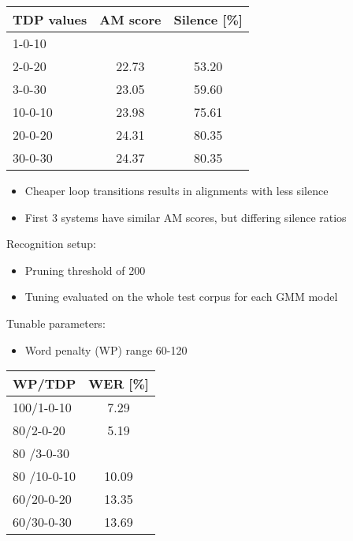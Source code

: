 \documentclass[11pt, a4paper, landscape]{article}
\begin{document}
\begin{center}
\begin{tabular}{| l |  c | c |} \toprule
  TDP values & AM score           & Silence [\%]      \\ \midrule
  1-0-10     & \color{red}{22.68} & \color{red}{43.48}\\
  2-0-20     & 22.73              & 53.20             \\
  3-0-30     & 23.05              & 59.60             \\ \midrule
  10-0-10    & 23.98              & 75.61             \\
  20-0-20    & 24.31              & 80.35             \\
  30-0-30    & 24.37              & 80.35             \\ \bottomrule
\end{tabular}
\end{center}
\begin{itemize}
	\item Cheaper loop transitions results in alignments with less silence
	\item First 3 systems have similar AM scores, but differing silence ratios
\end{itemize}
\vfill


\NewPage{}
\vfill
Recognition setup:
\begin{itemize}
	\item Pruning threshold of 200
	\item Tuning evaluated on the whole test corpus for each GMM model
\end{itemize}
Tunable parameters:
\begin{itemize}	
	\item Word penalty (WP) range 60-120
\end{itemize}

\begin{center}
	\begin{tabular}{| l | c |} \toprule
		WP/TDP      &    WER [\%]    \\ \midrule
		100/1-0-10  &    7.29        \\
		80/2-0-20   &    5.19        \\
		80 /3-0-30  &\color{red}{4.7}\\ \midrule
		80 /10-0-10 &    10.09       \\
		60/20-0-20  &    13.35       \\
		60/30-0-30  &    13.69       \\ \bottomrule
		
	\end{tabular}
\end{center}
\vfill
\end{document}
